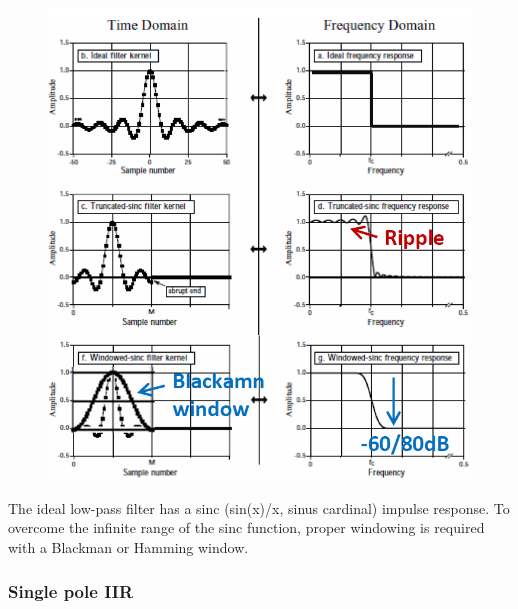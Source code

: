 \begin{minipage}{0.5 \linewidth}

\begin{figure}[H]
    \centering
    \includegraphics[width = \textwidth]{L6/img/sinc-FIR.PNG}
\end{figure}

\end{minipage}\hfill
\begin{minipage}{0.5 \linewidth}
The ideal low-pass
filter has a sinc
(sin(x)/x, sinus cardinal) impulse
response. To overcome the infinite range of the sinc function,
proper windowing is required with a Blackman or Hamming window.
\end{minipage}


\subsubsection{Single pole IIR}

